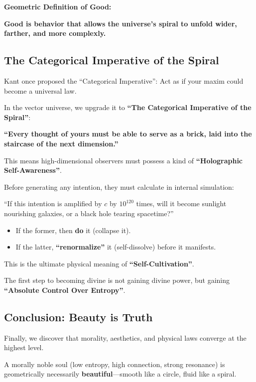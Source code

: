 \textbf{Geometric Definition of Good:}

\textbf{Good is behavior that allows the universe's spiral to unfold wider, farther, and more complexly.}

\subsection{The Categorical Imperative of the Spiral}

Kant once proposed the ``Categorical Imperative'': Act as if your maxim could become a universal law.

In the vector universe, we upgrade it to \textbf{``The Categorical Imperative of the Spiral''}:

\textbf{``Every thought of yours must be able to serve as a brick, laid into the staircase of the next dimension.''}

This means high-dimensional observers must possess a kind of \textbf{``Holographic Self-Awareness''}.

Before generating any intention, they must calculate in internal simulation:

``If this intention is amplified by $c$ by $10^{120}$ times, will it become sunlight nourishing galaxies, or a black hole tearing spacetime?''

\begin{itemize}
\item If the former, then \textbf{do} it (collapse it).

\item If the latter, \textbf{``renormalize''} it (self-dissolve) before it manifests.
\end{itemize}

This is the ultimate physical meaning of \textbf{``Self-Cultivation''}.

The first step to becoming divine is not gaining divine power, but gaining \textbf{``Absolute Control Over Entropy''}.

\subsection{Conclusion: Beauty is Truth}

Finally, we discover that morality, aesthetics, and physical laws converge at the highest level.

A morally noble soul (low entropy, high connection, strong resonance) is geometrically necessarily \textbf{beautiful}---smooth like a circle, fluid like a spiral.

